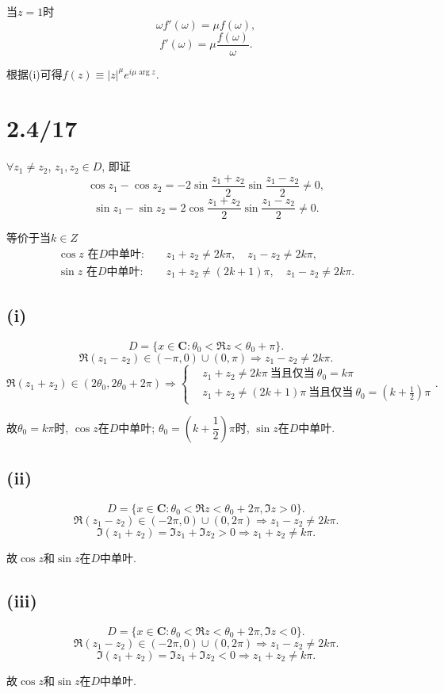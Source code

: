\documentclass[11pt,a4paper]{article}
\begin{document}
当$z=1$时
$$\omega f'(\omega)=\mu f(\omega),$$
$$f'(\omega)=\mu\frac{f(\omega)}{\omega}.$$

根据(i)可得$f(z)\equiv |z|^\mu e^{i\mu\arg z}$.

\section{2.4/17}

$\forall z_1\neq z_2$, $z_1, z_2\in D$, 即证
$$\cos z_1-\cos z_2=-2\sin\frac{z_1+z_2}{2}\sin\frac{z_1-z_2}{2}\neq 0,$$
$$\sin z_1-\sin z_2=2\cos\frac{z_1+z_2}{2}\sin\frac{z_1-z_2}{2}\neq 0.$$

等价于当$k\in Z$
\begin{align*}
  \cos z\text{ 在}D\text{中单叶}: & \quad z_1+z_2\neq 2k\pi,\quad z_1-z_2\neq 2k\pi,     \\
  \sin z\text{ 在}D\text{中单叶}: & \quad z_1+z_2\neq (2k+1)\pi,\quad z_1-z_2\neq 2k\pi.
\end{align*}


\subsection*{(i)}

$$D=\{x\in \mathbf{C}:\theta_0<\Re z<\theta_0+\pi\}.$$
$$\Re(z_1-z_2)\in(-\pi,0)\cup(0,\pi) \Longrightarrow z_1-z_2\neq 2k\pi.$$
$$\Re(z_1+z_2)\in(2\theta_0,2\theta_0+2\pi)\Longrightarrow \left\{\begin{aligned}
     & z_1+z_2\neq 2k\pi\ \text{当且仅当}\ \theta_0=k\pi                              \\
     & z_1+z_2\neq (2k+1)\pi\ \text{当且仅当}\ \theta_0=\left(k+\frac{1}{2}\right)\pi\end{aligned}\right..
$$

故$\theta_0=k\pi$时, $\cos z$在$D$中单叶; $\theta_0=\left(k+\dfrac{1}{2}\right)\pi$时, $\sin z$在$D$中单叶.

\subsection*{(ii)}

$$D=\{x\in \mathbf{C}:\theta_0<\Re z<\theta_0+2\pi,\Im z>0\}.$$
$$\Re(z_1-z_2)\in(-2\pi,0)\cup(0,2\pi) \Longrightarrow z_1-z_2\neq 2k\pi.$$
$$\Im(z_1+z_2)=\Im z_1+\Im z_2 > 0\Longrightarrow z_1+z_2\neq k\pi.$$

故$\cos z$和$\sin z$在$D$中单叶.

\subsection*{(iii)}

$$D=\{x\in \mathbf{C}:\theta_0<\Re z<\theta_0+2\pi,\Im z<0\}.$$
$$\Re(z_1-z_2)\in(-2\pi,0)\cup(0,2\pi) \Longrightarrow z_1-z_2\neq 2k\pi.$$
$$\Im(z_1+z_2)=\Im z_1+\Im z_2 < 0\Longrightarrow z_1+z_2\neq k\pi.$$

故$\cos z$和$\sin z$在$D$中单叶.
\end{document}
